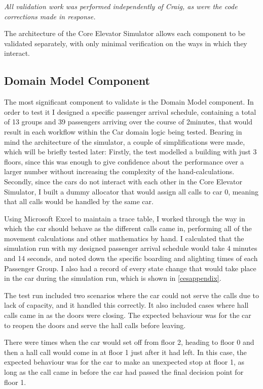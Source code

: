 \documentclass{UoYCSproject}
\begin{document}
\textit{All validation work was performed independently of Craig, as were the code corrections made in response.}

The architecture of the Core Elevator Simulator allows each component to be validated separately, with only minimal verification on the ways in which they interact.

\subsection{Domain Model Component}

The most significant component to validate is the Domain Model component.  In order to test it I designed a specific passenger arrival schedule, containing a total of 13 groups and 39 passengers arriving over the course of 2\textonehalf minutes, that would result in each workflow within the Car domain logic being tested.  Bearing in mind the architecture of the simulator, a couple of simplifications were made, which will be briefly tested later:  Firstly, the test modelled a building with just 3 floors, since this was enough to give confidence about the performance over a larger number without increasing the complexity of the hand-calculations.  Secondly, since the cars do not interact with each other in the Core Elevator Simulator, I built a dummy allocator that would assign all calls to car 0, meaning that all calls would be handled by the same car.

Using Microsoft Excel to maintain a trace table, I worked through the way in which the car should behave as the different calls came in, performing all of the movement calculations and other mathematics by hand.  I calculated that the simulation run with my designed passenger arrival schedule would take 4 minutes and 14 seconds, and noted down the specific boarding and alighting times of each Passenger Group.  I also had a record of every state change that would take place in the car during the simulation run, which is shown in \autoref{cesappendix}.

The test run included two scenarios where the car could not serve the calls due to lack of capacity, and it handled this correctly.  It also included cases where hall calls came in as the doors were closing.  The expected behaviour was for the car to reopen the doors and serve the hall calls before leaving.

There were times when the car would set off from floor 2, heading to floor 0 and then a hall call would come in at floor 1 just after it had left.  In this case, the expected behaviour was for the car to make an unexpected stop at floor 1, as long as the call came in before the car had passed the final decision point for floor 1.
\end{document}
